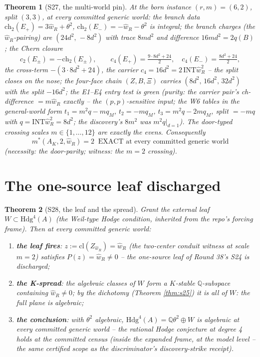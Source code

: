 \documentclass[11pt]{article}
\newtheorem{theorem}{Theorem}[section]
\begin{document}
\begin{theorem}[S27, the multi-world pin]\label{thm:s27}
At the born instance $(r,m)=(6,2)$, split $(3,3)$, at every committed generic
world: the branch data
$\mathrm{ch}_2(E_+) = 3\hat w_R+\theta^2$,
$\mathrm{ch}_2(E_-) = -\hat w_R-\theta^2$ is integral; the branch charges
(the $\hat w_R$-pairing) are $(24d^2,\,-8d^2)$ with trace $8md^2$ and
difference $16md^2 = 2q(B)$; the Chern closure
\[
c_2(E_\pm) = -\mathrm{ch}_2(E_\pm),\qquad
c_4(E_+) = \tfrac{9\cdot 8d^2+24}{2},\quad
c_4(E_-) = \tfrac{8d^2+24}{2},
\]
the cross-term $-(3\cdot 8d^2+24)$, the carrier
$c_4 = 16d^2 = 2\,\mathrm{INT}\hat w_R^2$ -- the split closes on the nose;
the four-face chain $(Z,B,\Xi)$ carries
$(8d^2,\,16d^2,\,32d^2)$ with the split $-16d^2$; the E1--E4 entry test is
green (purity: the carrier pair's ch-difference $= m\hat w_R$ exactly -- the
$(p,p)$-sensitive input; the W6 tables in the general-world form
$t_1 = m^2q - mq_M$, $t_2 = -mq_M$, $t_3 = m^2q - 2mq_M$, split $=-mq$ with
$q = \mathrm{INT}\hat w_R^2 = 8d^2$; the discovery's $8m^2$ was
$m^2q|_{d=1}$). The door-typed crossing scales $m\in\{1,\dots,12\}$ are
exactly the evens. Consequently
\[
\boxed{\,m^*(A_K,2,\hat w_R) = 2\ \text{ EXACT at every committed generic
world}\,}
\]
(necessity: the door-parity; witness: the $m=2$ crossing).
\end{theorem}

\section{The one-source leaf discharged}

\begin{theorem}[S28, the leaf and the spread]\label{thm:s28}
Grant the external leaf $W\subset\mathrm{Hdg}^4(A)$ (the Weil-type Hodge
condition, inherited from the repo's forcing frame). Then at every committed
generic world:
\begin{enumerate}
\item \textbf{the leaf fires}: $z := \mathrm{cl}(Z_{\hat w_R}) = \hat w_R$
(the two-center conduit witness at scale $m=2$) satisfies
$P(z) = \hat w_R \neq 0$ -- the one-source leaf of Round 38's S24 is
discharged;
\item \textbf{the K-spread}: the algebraic classes of $W$ form a
$K$-stable $\mathbb{Q}$-subspace containing $\hat w_R\neq 0$; by the
dichotomy (Theorem \ref{thm:s25}) it is all of $W$: the full plane is
algebraic;
\item \textbf{the conclusion}: with $\theta^2$ algebraic,
$\mathrm{Hdg}^4(A) = \mathbb{Q}\theta^2\oplus W$ is algebraic at every
committed generic world -- the rational Hodge conjecture at degree 4 holds at
the committed census (inside the expanded frame, at the model level -- the
same certified scope as the discriminator's discovery-strike receipt).
\end{enumerate}
\end{theorem}
\end{document}

